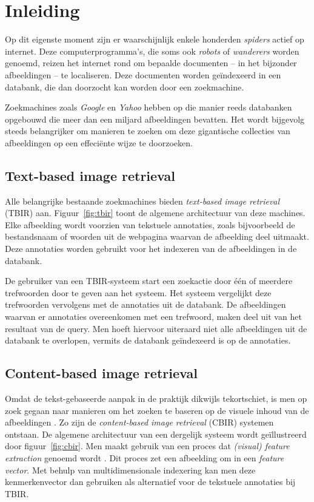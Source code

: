 \chapter{Inleiding}

Op dit eigenste moment zijn er waarschijnlijk enkele honderden \emph{spiders} actief op internet.
Deze computerprogramma's, die soms ook \emph{robots} of \emph{wanderers} worden genoemd, reizen
het internet rond om bepaalde documenten -- in het bijzonder afbeeldingen -- te localiseren. Deze 
documenten worden ge\"indexeerd in een databank, die dan doorzocht kan worden door een zoekmachine. 

Zoekmachines zoals \emph{Google} en \emph{Yahoo} hebben op die manier reeds databanken
opgebouwd die meer dan een miljard afbeeldingen bevatten. Het wordt bijgevolg steeds belangrijker
om manieren te zoeken om deze gigantische collecties van afbeeldingen op een effeci\"ente wijze
te doorzoeken.


\section{Text-based image retrieval}

Alle belangrijke bestaande zoekmachines bieden \emph{text-based image retrieval} (TBIR) aan. 
Figuur~\ref{fig:tbir} toont de algemene architectuur van deze machines. Elke afbeelding 
wordt voorzien van tekstuele annotaties, zoals bijvoorbeeld de 
bestandsnaam of woorden uit de webpagina waarvan de afbeelding deel uitmaakt. Deze annotaties
worden gebruikt voor het indexeren van de afbeeldingen in de databank.

De gebruiker van een TBIR-systeem start een zoekactie door \'e\'en of meerdere trefwoorden door te geven
aan het systeem. Het systeem vergelijkt deze trefwoorden vervolgens met de annotaties uit
de databank. De afbeeldingen waarvan er annotaties overeenkomen met een trefwoord, maken
deel uit van het resultaat van de query. Men hoeft hiervoor uiteraard niet alle afbeeldingen
uit de databank te overlopen, vermits de databank ge\"indexeerd is op de annotaties. 

\section{Content-based image retrieval}

Omdat de tekst-gebaseerde aanpak in de praktijk dikwijls tekortschiet, is men op zoek gegaan 
naar manieren om het zoeken te baseren op de visuele inhoud van de afbeeldingen 
\cite{veltcamp:cbirs}. Zo zijn de \emph{content-based image retrieval} (CBIR) systemen ontstaan. 
De algemene architectuur van een dergelijk systeem wordt ge\"illustreerd door
figuur~\ref{fig:cbir}. Men maakt gebruik van een proces dat 
\emph{(visual) feature extraction} genoemd wordt \cite{rui:image_retr}. Dit proces zet een afbeelding om in een 
\emph{feature vector}. Met behulp van multidimensionale indexering kan men deze kenmerkenvector
dan gebruiken als alternatief voor de tekstuele annotaties bij TBIR.

